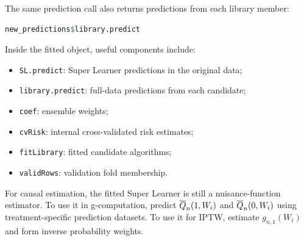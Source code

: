 The same prediction call also returns predictions from each library member:

\begin{implementationbox}
\begin{lstlisting}[language=R]
new_predictions$library.predict
\end{lstlisting}
\end{implementationbox}

Inside the fitted object, useful components include:
\begin{itemize}
\item \texttt{SL.predict}: Super Learner predictions in the original data;
\item \texttt{library.predict}: full-data predictions from each candidate;
\item \texttt{coef}: ensemble weights;
\item \texttt{cvRisk}: internal cross-validated risk estimates;
\item \texttt{fitLibrary}: fitted candidate algorithms;
\item \texttt{validRows}: validation fold membership.
\end{itemize}

\begin{estimationbox}
For causal estimation, the fitted Super Learner is still a nuisance-function estimator.
To use it in g-computation, predict $\overline{Q}_n(1,W_i)$ and $\overline{Q}_n(0,W_i)$ using
treatment-specific prediction datasets. To use it for IPTW, estimate $g_{n,1}(W_i)$
and form inverse probability weights.
\end{estimationbox}
